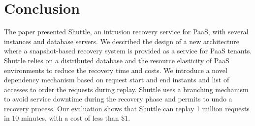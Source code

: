 
\section{Conclusion}
\label{sec:conclusion}
The paper presented Shuttle, an intrusion recovery service for PaaS, with several instances and database servers. We described the design of a new architecture where a snapshot-based recovery system is provided as a service for PaaS tenants. Shuttle relies on a distributed database and the resource elasticity of PaaS environments to reduce the recovery time and costs. We introduce a novel dependency mechanism based on request start and end instants and list of accesses to order the requests during replay. 
Shuttle uses a branching mechanism to avoid service downtime during the recovery phase and permits to undo a recovery process.  
Our evaluation shows that Shuttle can replay 1 million requests in 10 minutes, with a cost of less than \$1. 


